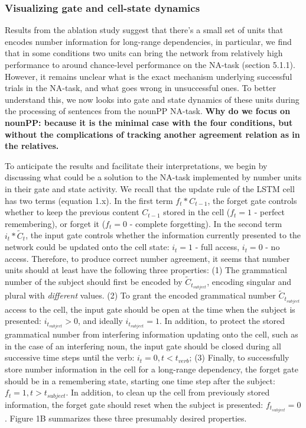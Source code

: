 \subsubsection{Visualizing gate and cell-state dynamics}
Results from the ablation study suggest that there's a small set of units that encodes number information for long-range dependencies, in particular, we find that in some conditions two units can bring the network from relatively high performance to around chance-level performance on the NA-task (section 5.1.1). 
However, it remains unclear what is the exact mechanism underlying successful trials in the NA-task, and what goes wrong in unsuccessful ones. 
To better understand this, we now looks into gate and state dynamics of these units during the processing of sentences from the nounPP NA-task.  \textbf{Why do we focus on nounPP: because it is the minimal case with the four conditions, but without the complications of tracking another agreement relation as in the relatives.}

To anticipate the results and facilitate their interpretations, we begin by discussing what could be a solution to the NA-task implemented by number units in their gate and state activity. 
We recall that the update rule of the LSTM cell has two terms (equation 1.x). 
In the first term $f_t * C_{t-1}$, the forget gate controls whether to keep the previous content $C_{t-1}$ stored in the cell ($f_t=1$ - perfect remembering), or forget it ($f_t=0$ - complete forgetting). 
In the second term $i_t*\tilde{C}_t$, the input gate controls whether the information currently presented to the network could be updated onto the cell state: $i_t=1$ - full access, $i_t=0$ - no access. 
Therefore, to produce correct number agreement, it seems that number units should at least have the following three properties: (1) The grammatical number of the subject should first be encoded by $\tilde{C}_{t_{subject}}$, encoding singular and plural with \textit{different} values. 
(2) To grant the encoded grammatical number $\tilde{C}_{t_{subject}}$ access to the cell, the input gate should be open at the time when the subject is presented: $i_{t_{subject}}>0$, and ideally $i_{t_{subject}}=1$. 
In addition, to protect the stored grammatical number from interfering information updating onto the cell, such as in the case of an interfering noun, the input gate should be closed during all successive time steps until the verb: $i_t=0, t<t_{verb}$; (3) Finally, to successfully store number information in the cell for a long-range dependency, the forget gate should be in a remembering state, starting one time step after the subject: $f_t=1, t>t_{subject}$. 
In addition, to clean up the cell from previously stored information, the forget gate should reset when the subject is presented: $f_{t_{subject}}=0$. 
Figure 1B summarizes these three presumably desired properties.

